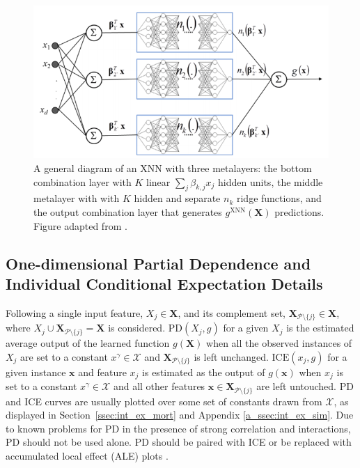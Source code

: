 \documentclass[information,article,accept,moreauthors,pdftex]{Definitions/mdpi}
\begin{document}
\begin{figure}[H]
	\centering
	\includegraphics[width=12cm]{img/xnn_arch.png}
	\caption{{A general diagram} of an XNN with three metalayers: the bottom combination layer with  $K$ linear $\sum_j\beta_{k,j}x_j$ hidden units, the middle metalayer with with $K$ hidden and separate $n_k$ ridge functions, and the output combination layer that generates $g^{\text{XNN}}(\mathbf{X})$ predictions. Figure adapted from \citet{wf_xnn}.}
	\label{fig:xnn_arch}%
\end{figure} 

\subsection{One-dimensional Partial Dependence and Individual Conditional Expectation Details}\label{a_ssec:pd_ice}

Following \citet{esl} a single input feature, $X_j \in \mathbf{X}$, and its complement set, $\mathbf{X}_{\mathcal{P} \setminus \{j\}} \in \mathbf{X}$, where $X_j \cup \mathbf{X}_{\mathcal{P} \setminus \{j\}} = \mathbf{X}$ is considered. $\text{PD}(X_j, g)$ for a given $X_j$ is the estimated average output of the learned function $g(\mathbf{X})$ when all the observed instances of $X_j$ are set to a constant $x^\gamma \in \mathcal{X}$ and $\mathbf{X}_{\mathcal{P} \setminus \{j\}}$ is left unchanged. $\text{ICE}(x_j, g)$ for a given instance $\mathbf{x}$ and feature $x_j$ is estimated as the output of $g(\mathbf{x})$ when $x_j$ is set to a constant $x^\gamma \in \mathcal{X}$ and all other features $\mathbf{x} \in \mathbf{X}_{\mathcal{P} \setminus \{j\}}$ are left untouched. PD and ICE curves are usually plotted over some set of constants drawn from $\mathcal{X}$, as displayed in Section~\ref{ssec:int_ex_mort} and Appendix \ref{a_ssec:int_ex_sim}. Due to known problems for PD in the presence of strong correlation and interactions, PD should not be used alone. PD should be paired with ICE or be replaced with accumulated local effect (ALE) plots \cite{ice_plots,ale_plot}.
\end{document}
